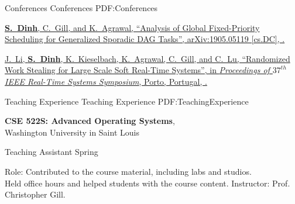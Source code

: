 \documentclass[letterpaper,MMMyyyy,nonstopmode]{simpleresumecv}
\begin{document}
\begin{Body}

\endgroup

\BigGap
\SubSection
{Conferences}
{Conferences}
{PDF:Conferences}

\begingroup
\renewcommand{\MaxNumberedItem}{[100]}

\BigGap
\NumberedItem{[1]}
\href{https://arxiv.org/abs/1905.05119}
{\textbf{S.~Dinh}, C.~Gill, and K.~Agrawal,
``Analysis of Global Fixed-Priority Scheduling for Generalized Sporadic DAG Tasks'', 
arXiv:1905.05119 [cs.DC],
.}

\Gap
\NumberedItem{[2]}
\href{https://ieeexplore.ieee.org/document/7809856/}
{J.~Li, \textbf{S.~Dinh}, K.~Kieselbach, K.~Agrawal, C.~Gill, and C.~Lu,
``Randomized Work Stealing for Large Scale Soft Real-Time Systems'',
in \textit{Proceedings of $37^{th}$ IEEE Real-Time Systems Symposium},
Porto, Portugal,
.}



\endgroup

\Section
{Teaching \newline Experience}
{Teaching \newline Experience}
{PDF:TeachingExperience}

\Entry
{\textbf{CSE 522S: Advanced Operating Systems}}, \\
Washington University in Saint Louis

\BulletItem Teaching Assistant \hfill Spring~
\begin{Detail}
\SubBulletItem Role: Contributed to the course material, including labs and studios. \\
Held office hours and helped students with the course content. 
\SubBulletItem Instructor: Prof. Christopher Gill.
\end{Detail}


\end{Body}
\end{document}
